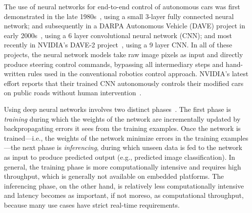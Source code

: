 The use of neural networks for end-to-end control of autonomous
cars was first demonstrated in the late 1980s~\cite{Pomerleau1989},
using a small 3-layer fully connected neural network; and subsequently
in a DARPA Autonomous Vehicle (DAVE) project in early
2000s~\cite{LeCun:04}, using a 6 layer convolutional neural network
(CNN); and most recently in NVIDIA's DAVE-2
project~\cite{Bojarski2016}, using a 9 layer CNN. In all of these projects,
the neural network models take raw image pixels as input and directly
produce steering control commands, bypassing all intermediary steps and
hand-written rules used in the conventional robotics control approach.  
NVIDIA's latest effort reports that their trained CNN
autonomously controls their modified cars on public roads without human
intervention~\cite{Bojarski2016}.

Using deep neural networks involves two distinct
phases~\cite{NVIDIA2015}. The first
phase is \emph{training} during which the weights of the network are
incrementally updated by backpropagating errors it sees from the
training examples. Once the network is trained---i.e., the weights of
the network minimize errors in the training examples---the next phase
is \emph{inferencing}, during which unseen data is fed to the network
as input to produce predicted output (e.g., predicted image
classification). In general, the training phase is more computationally
intensive and requires high throughput, which is generally not
available on embedded platforms. The inferencing phase, on the
other hand, is relatively less computationally intensive and latency becomes
as important, if not moreso, as computational throughput, because many
use cases have strict real-time requirements.






